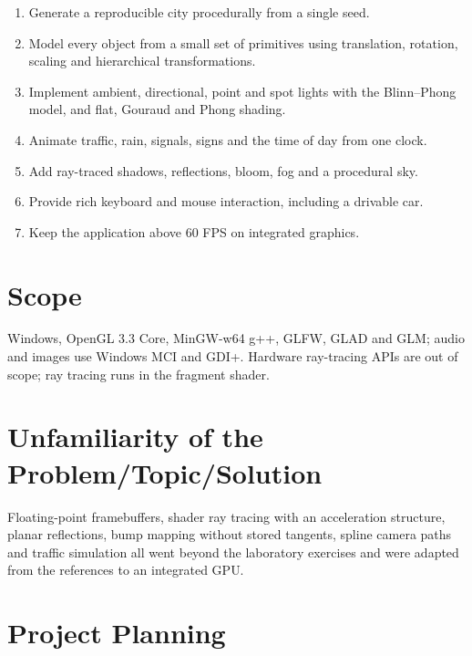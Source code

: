 \documentclass[12pt, a4paper]{report}
\begin{document}
\begin{justify}
  {\fontsize{12}{13.8}\selectfont
    \begin{enumerate}
      \item Generate a reproducible city procedurally from a single seed.
      \item Model every object from a small set of primitives using translation, rotation, scaling and hierarchical transformations.
      \item Implement ambient, directional, point and spot lights with the Blinn--Phong model, and flat, Gouraud and Phong shading.
      \item Animate traffic, rain, signals, signs and the time of day from one clock.
      \item Add ray-traced shadows, reflections, bloom, fog and a procedural sky.
      \item Provide rich keyboard and mouse interaction, including a drivable car.
      \item Keep the application above 60 FPS on integrated graphics.
    \end{enumerate}
  }
\end{justify}

\section{Scope}

\begin{justify}
  {\fontsize{12}{13.8}\selectfont
    Windows, OpenGL 3.3 Core, MinGW-w64 g++, GLFW, GLAD and GLM; audio and images use Windows MCI and GDI+. Hardware ray-tracing APIs are out of scope; ray tracing runs in the fragment shader.
  }
\end{justify}

\section{Unfamiliarity of the Problem/Topic/Solution}

\begin{justify}
  {\fontsize{12}{13.8}\selectfont
    Floating-point framebuffers, shader ray tracing with an acceleration structure, planar reflections, bump mapping without stored tangents, spline camera paths and traffic simulation all went beyond the laboratory exercises and were adapted from the references to an integrated GPU.
  }
\end{justify}

\section{Project Planning}
\end{document}

